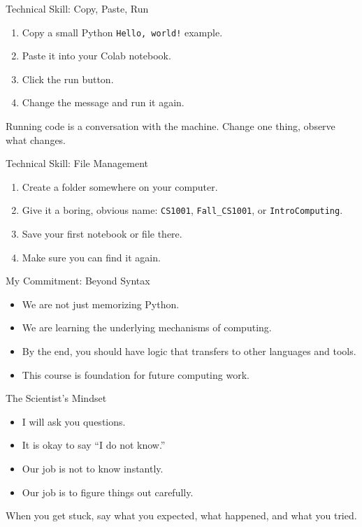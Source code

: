 \documentclass[aspectratio=169]{beamer}
\begin{document}
\begin{frame}{Technical Skill: Copy, Paste, Run}
  \begin{enumerate}
    \item Copy a small Python \texttt{Hello, world!} example.
    \item Paste it into your Colab notebook.
    \item Click the run button.
    \item Change the message and run it again.
  \end{enumerate}
  \vspace{0.12in}
  \begin{keyidea}
    Running code is a conversation with the machine. Change one thing, observe what changes.
  \end{keyidea}
\end{frame}

\begin{frame}{Technical Skill: File Management}
  \begin{enumerate}
    \item Create a folder somewhere on your computer.
    \item Give it a boring, obvious name: \texttt{CS1001}, \texttt{Fall\_CS1001}, or \texttt{IntroComputing}.
    \item Save your first notebook or file there.
    \item Make sure you can find it again.
  \end{enumerate}
\end{frame}


\begin{frame}{My Commitment: Beyond Syntax}
  \begin{itemize}
    \item We are not just memorizing Python.
    \item We are learning the underlying mechanisms of computing.
    \item By the end, you should have logic that transfers to other languages and tools.
    \item This course is foundation for future computing work.
  \end{itemize}
\end{frame}

\begin{frame}{The Scientist's Mindset}
  \begin{itemize}
    \item I will ask you questions.
    \item It is okay to say ``I do not know.''
    \item Our job is not to know instantly.
    \item Our job is to figure things out carefully.
  \end{itemize}
  \vspace{0.15in}
  \begin{activity}
    When you get stuck, say what you expected, what happened, and what you tried.
  \end{activity}
\end{frame}
\end{document}
